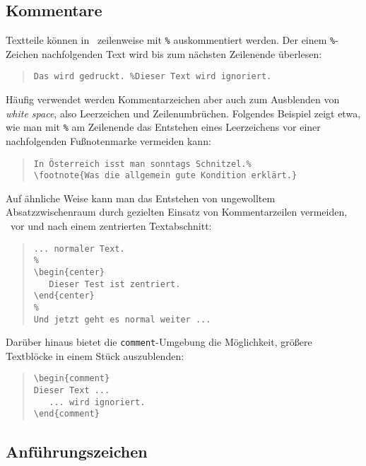 \subsection{Kommentare}
\label{sec:kommentare}


Textteile können in \latex\ zeilenweise mit \verb!%! auskommentiert werden. Der einem 
\verb!%!-Zeichen nachfolgenden Text wird bis zum nächsten Zeilenende überlesen:
%
\begin{quote}
\verb!Das wird gedruckt. %Dieser Text wird ignoriert.!
\end{quote}
%
Häufig verwendet werden Kommentarzeichen aber auch zum Ausblenden von 
\emph{white space}, also Leerzeichen und Zeilenumbrüchen.
Folgendes Beispiel zeigt etwa, wie man mit \verb!%! am Zeilenende das Entstehen
eines Leerzeichens vor einer nachfolgenden Fußnotenmarke vermeiden kann:
%
\begin{quote}
\begin{verbatim}
In Österreich isst man sonntags Schnitzel.%
\footnote{Was die allgemein gute Kondition erklärt.}
\end{verbatim}
\end{quote}
%

\begin{sloppypar}
\noindent
Auf ähnliche Weise kann man das Entstehen von ungewolltem Absatz\-zwischenraum durch 
gezielten Einsatz von Kommentarzeilen vermeiden, \zB\ vor und nach einem zentrierten
Textabschnitt:
\end{sloppypar}
%
\begin{quote}
\begin{verbatim}
... normaler Text.
%
\begin{center}
   Dieser Test ist zentriert.
\end{center}
%
Und jetzt geht es normal weiter ...
\end{verbatim}
\end{quote}
%
Darüber hinaus bietet die \verb!comment!-Umgebung die Möglichkeit, größere Text\-blöcke
in einem Stück auszublenden:
%
\begin{quote}
\begin{verbatim}
\begin{comment}
Dieser Text ...
   ... wird ignoriert.
\end{comment}
\end{verbatim}
\end{quote}




\subsection{Anführungszeichen}
\label{sec:anfuehrungszeichen}

